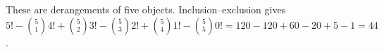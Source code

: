 These are derangements of five objects. Inclusion--exclusion gives $5!-\binom51 4!+\binom52 3!-\binom53 2!+\binom54 1!-\binom55 0!=120-120+60-20+5-1=\boxed{44}$.
